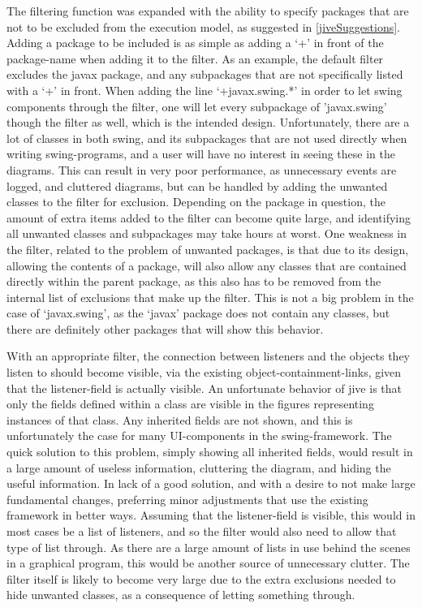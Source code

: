 The filtering function was expanded with the ability to specify packages that are not to be excluded from the execution model, as suggested in \autoref{jiveSuggestions}.
Adding a package to be included is as simple as adding a `+' in front of the package-name when adding it to the filter.
As an example, the default filter excludes the javax package, and any subpackages that are not specifically listed with a `+' in front.
When adding the line `+javax.swing.*' in order to let swing components through the filter, one will let every subpackage of 'javax.swing' though the filter as well, which is the intended design.
Unfortunately, there are a lot of classes in both swing, and its subpackages that are not used directly when writing swing-programs, and a user will have no interest in seeing these in the diagrams.
This can result in very poor performance, as unnecessary events are logged, and cluttered diagrams, but can be handled by adding the unwanted classes to the filter for exclusion.
Depending on the package in question, the amount of extra items added to the filter can become quite large, and identifying all unwanted classes and subpackages may take hours at worst.
One weakness in the filter, related to the problem of unwanted packages, is that due to its design, allowing the contents of a package, will also allow any classes that are contained directly within the parent package, as this also has to be removed from the internal list of exclusions that make up the filter.
This is not a big problem in the case of `javax.swing', as the `javax' package does not contain any classes, but there are definitely other packages that will show this behavior.

With an appropriate filter, the connection between listeners and the objects they listen to should become visible, via the existing object-containment-links, given that the listener-field is actually visible.
An unfortunate behavior of \gls{jive} is that only the fields defined within a class are visible in the figures representing instances of that class.
Any inherited fields are not shown, and this is unfortunately the case for many UI-components in the swing-framework.
The quick solution to this problem, simply showing all inherited fields, would result in a large amount of useless information, cluttering the diagram, and hiding the useful information.
In lack of a good solution, and with a desire to not make large fundamental changes, preferring minor adjustments that use the existing framework in better ways.
Assuming that the listener-field is visible, this would in most cases be a list of listeners, and so the filter would also need to allow that type of list through.
As there are a large amount of lists in use behind the scenes in a graphical program, this would be another source of unnecessary clutter.
The filter itself is likely to become very large due to the extra exclusions needed to hide unwanted classes, as a consequence of letting something through.

